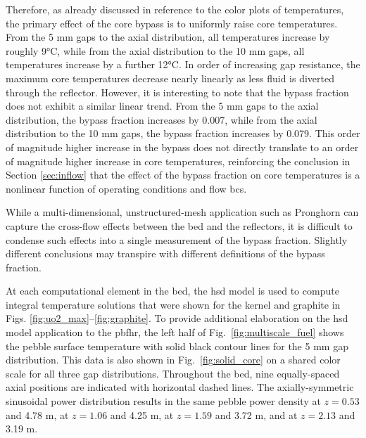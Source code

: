Therefore, as already discussed in reference to the color plots of temperatures, the primary effect of the core bypass is to uniformly raise core temperatures. From the 5 \si{\milli\meter} gaps to the axial distribution, all temperatures increase by roughly 9\si{\celsius}, while from the axial distribution to the 10 \si{\milli\meter} gaps, all temperatures increase by a further 12\si{\celsius}. In order of increasing gap resistance, the maximum core temperatures decrease nearly linearly as less fluid is diverted through the reflector. However, it is interesting to note that the bypass fraction does not exhibit a similar linear trend. From the 5 \si{\milli\meter} gaps to the axial distribution, the bypass fraction increases by 0.007, while from the axial distribution to the 10 \si{\milli\meter} gaps, the bypass fraction increases by 0.079. This order of magnitude higher increase in the bypass does not directly translate to an order of magnitude higher increase in core temperatures, reinforcing the conclusion in Section \ref{sec:inflow} that the effect of the bypass fraction on core temperatures is a nonlinear function of operating conditions and flow \glspl{bc}. 

While a multi-dimensional, unstructured-mesh application such as Pronghorn can capture the cross-flow effects between the bed and the reflectors, it is difficult to condense such effects into a single measurement of the bypass fraction. Slightly different conclusions may transpire with different definitions of the bypass fraction.

At each computational element in the bed, the \gls{hsd} model is used to compute integral temperature solutions that were shown for the kernel and graphite in Figs. \ref{fig:uo2_max}--\ref{fig:graphite}. To provide additional elaboration on the \gls{hsd} model application to the \gls{pbfhr}, the left half of Fig.\ \ref{fig:multiscale_fuel} shows the pebble surface temperature with solid black contour lines for the 5 \si{\milli\meter} gap distribution. This data is also shown in Fig.\ \ref{fig:solid_core} on a shared color scale for all three gap distributions. Throughout the bed, nine equally-spaced axial positions are indicated with horizontal dashed lines. The axially-symmetric sinusoidal power distribution results in the same pebble power density at \(z=0.53\) and 4.78 \si{\meter}, at \(z=1.06\) and 4.25 \si{\meter}, at \(z=1.59\) and 3.72 \si{\meter}, and at \(z=2.13\) and 3.19 \si{\meter}.


